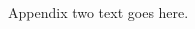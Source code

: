 \documentclass[12pt, draftclsnofoot, onecolumn]{IEEEtran}
\begin{document}
\begin{spacing}{2}
\section{}
Appendix two text goes here.






\ifCLASSOPTIONcaptionsoff
  \newpage
\fi





%
%
%



% 


\end{spacing}
\end{document}
